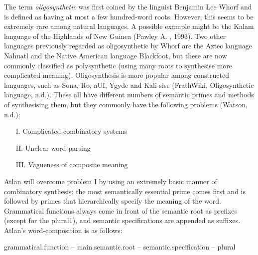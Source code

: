 
The term \textit{oligosynthetic} was first coined by the linguist Benjamin Lee Whorf and is defined as having at most a few hundred-word roots. However, this seems to be extremely rare among natural languages. A possible example might be the Kalam language of the Highlands of New Guinea (Pawley A. , 1993). Two other languages previously regarded as oligosynthetic by Whorf are the Aztec language Nahuatl and the Native American language Blackfoot, but these are now commonly classified as polysynthetic (using many roots to synthesise more complicated meaning). Oligosynthesis is more popular among constructed languages, such as Sona, Ro, aUI, Ygyde and Kali-sise (FrathWiki, Oligosynthetic language, n.d.). These all have different numbers of semantic primes and methods of synthesising them, but they commonly have the following problems (Watson, n.d.): 

\begin{itemize}
\item [I.] Complicated combinatory systems  

\item[II.] Unclear word-parsing  

\item[III.]Vagueness of composite meaning 
\end{itemize}

Atlan will overcome problem I by using an extremely basic manner of combinatory synthesis: the most semantically essential prime comes first and is followed by primes that hierarchically specify the meaning of the word. Grammatical functions always come in front of the semantic root as prefixes (except for the plural1), and semantic specifications are appended as suffixes. Atlan's word-composition is as follows:  

\begin{cent\idx{scent}er}
{grammatical.function –  main.semantic.root – semantic.specification – plural} 
\end{cent\idx{scent}er}
\quad
 

